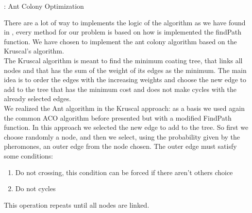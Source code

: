 \begin{algorithm}
\caption{: Ant Colony Optimization} \label{alg:Ant}
\begin{algorithmic} 
\REPEAT
{}
\end{algorithmic}
\end{algorithm}

There are a lot of way to implements the logic of the algorithm as we have found in \cite{nedlin2017ant}, every method for our problem is based on how is implemented the findPath function. We have chosen to implement the ant colony algorithm based on the Kruscal’s algorithm. \\
The Kruscal algorithm \cite{kruskal1956shortest} is meant to find the minimum coating tree, that links all nodes and that has the sum of the weight of its edges as the minimum. The main idea is to order the edges with the increasing weights and choose the new edge to add to the tree that has the minimum cost and does not make cycles with the already selected edges.\\
We realized the Ant algorithm in the Kruscal approach: as a basis we used again the common ACO algorithm before presented but with a modified FindPath function. In this approach we selected the new edge to add to the tree. So first we choose randomly a node, and then we select, using the probability given by the pheromones, an outer edge from the node chosen. The outer edge must satisfy some conditions:
\begin{enumerate}
\setlength{\parskip}{0pt}
\setlength{\itemsep}{0pt plus 1pt}
\item Do not crossing, this condition can be forced if there aren’t others choice
\item Do not cycles
\end{enumerate}
This operation repeats until all nodes are linked.

